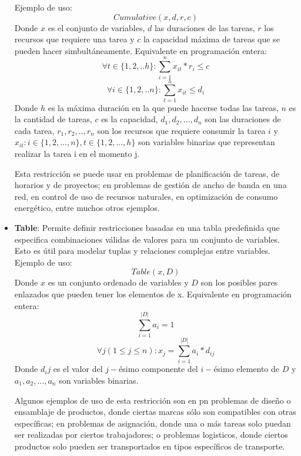 \documentclass[12pt]{report}
\begin{document}
\begin{itemize}
    Ejemplo de uso:
    $$Cumulative(x,d,r, c)$$
    Donde $x$ es el conjunto de variables, $d$ las duraciones de las tareas, $r$ los recursos que requiere una tarea y $c$ la capacidad máxima de tareas que se pueden hacer simbultáneamente.
    Equivalente en programación entera:
    $$\forall t \in \{1,2,..h\}:\sum_{i=1}^nx_{it}*r_i\leq c$$
    $$\forall i \in \{1,2,..n\}:\sum_{t=1}^hx_{it}\leq d_i$$
    Donde $h$ es la máxima duración en la que puede hacerse todas las tareas, $n$ es la cantidad de tareas, $c$ es la capacidad, $d_1,d_2,...,d_n$ son las duraciones de cada tarea, $r_1,r_2,..,r_n$ son los recursos que requiere consumir la tarea $i$ y $x_{it}:i\in\{1,2,...,n\},t\in\{1,2,...,h\}$ son variables binarias que representan realizar la tarea i en el momento j.

    Esta restricción se puede usar en problemas de planificación de tareas, de horarios y de proyectos; en problemas de gestión de ancho de banda en una red, en control de uso de recursos naturales, en optimización de consumo energético, entre muchos otros ejemplos.\\
    
    \item \textbf{Table}: Permite definir restricciones basadas en una tabla predefinida que especifica combinaciones válidas de valores para un conjunto de variables. Esto es útil para modelar tuplas y relaciones complejas entre variables.
    Ejemplo de uso:
    $$Table(x,D)$$
    Donde $x$ es un conjunto ordenado de variables y $D$ son los posibles pares enlazados que pueden tener los elementos de x. 
    Equivalente en programación entera:
    $$\sum_{i=1}^{|D|}a_{i}=1$$
    $$\forall j(1\leq j\leq n):x_j=\sum_{i=1}^{|D|}a_i*d_{ij}$$
    Donde $d_ij$ es el valor del $j-$ésimo componente del $i-$ésimo elemento de $D$ y $a_1,a_2,...,a_n$ son variables binarias.

    Algunos ejemplos de uso de esta restricción son en pn problemas de diseño o ensamblaje de productos, donde ciertas marcas sólo son compatibles con otras específicas; en problemas de asignación, donde una o más tareas solo puedan ser realizadas por ciertos trabajadores; o problemas logisticos, donde ciertos productos solo pueden ser transportados en tipos específicos de transporte.
    
\end{itemize}

\end{document}
